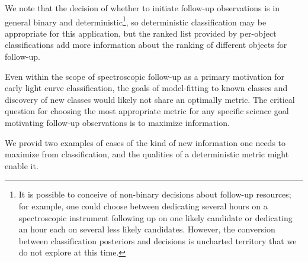 
We note that the decision of whether to initiate follow-up observations is in general binary and deterministic\footnote{It is possible to conceive of non-binary decisions about follow-up resources; for example, one could choose between dedicating several hours on a spectroscopic instrument following up on one likely candidate or dedicating an hour each on several less likely candidates.  However, the conversion between classification posteriors and decisions is uncharted territory that we do not explore at this time.}, so deterministic classification may be appropriate for this application, but the ranked list provided by per-object classifications add more information about the ranking of different objects for follow-up.

Even within the scope of spectroscopic follow-up as a primary motivation for early light curve classification, the goals of model-fitting to known classes and discovery of new classes would likely not share an optimally metric. The critical question for choosing the most appropriate metric for any specific science goal motivating follow-up observations is to maximize information.

We provid two examples of cases of the kind of new information one needs to maximize from classification, and the qualities of a deterministic metric might enable it.

